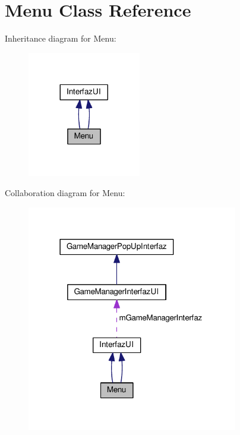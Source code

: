 \hypertarget{class_menu}{}\section{Menu Class Reference}
\label{class_menu}


Inheritance diagram for Menu\+:
\nopagebreak
\begin{figure}[H]
\begin{center}
\leavevmode
\includegraphics[width=140pt]{class_menu__inherit__graph}
\end{center}
\end{figure}


Collaboration diagram for Menu\+:
\nopagebreak
\begin{figure}[H]
\begin{center}
\leavevmode
\includegraphics[width=261pt]{class_menu__coll__graph}
\end{center}
\end{figure}
